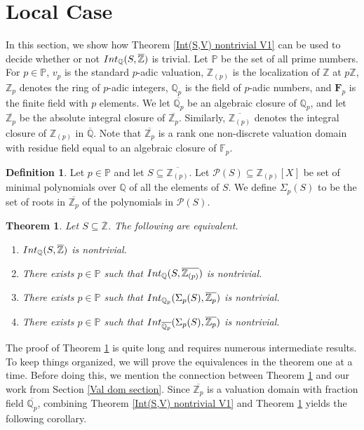 \documentclass{article}
\newtheorem{Thm}[equation]{Theorem}
\theoremstyle{definition}\newtheorem{Def}[equation]{Definition}
\theoremstyle{definition}\newtheorem{Ques}[equation]{Question}
\theoremstyle{definition}\newtheorem{Conj}[equation]{Conjecture}
\theoremstyle{definition}\newtheorem{Not}[equation]{Notation}
\newcommand{\Q}{\mathbb{Q}}
\newcommand{\oQ}{\overline{\Q}}
\newcommand{\oZ}{\overline{\Z}}
\newcommand{\Z}{\mathbb{Z}}
\newcommand{\oZp}{\overline{\Z_p}}
\newcommand{\oQZp}{\overline{\Z_{(p)}}}
\newcommand{\oQp}{\overline{\Q_p}}
\newcommand{\Int}{\textnormal{Int}}
\newcommand{\IntQ}{\Int_{\Q}}
\newcommand{\PP}{\mathbb{P}}
\numberwithin{equation}{section}
\begin{document}
\section{Local Case}\label{Local section}
In this section, we show how Theorem \ref{Int(S,V) nontrivial V1} can be used to decide whether or not $\IntQ(S,\oZ)$ is trivial. Let $\PP$ be the set of all prime numbers. For $p \in \PP$, $v_p$ is the standard $p$-adic valuation, $\Z_{(p)}$ is the localization of $\Z$ at $p\Z$, $\Z_p$ denotes the ring of $p$-adic integers, $\Q_p$ is the field of $p$-adic numbers, and $\mathbf{F}_p$ is the finite field with $p$ elements. We let $\oQp$ be an algebraic closure of $\Q_p$, and let $\oZp$ be the absolute integral closure of $\oZp$. Similarly, $\overline{\Z_{(p)}}$ denotes the integral closure of $\Z_{(p)}$ in $\oQ$. Note that $\oZp$ is a rank one non-discrete valuation domain with residue field equal to an algebraic closure of $\mathbb F_p$.%

\begin{Def}\label{Sigma_p}
Let $p \in \PP$ and let $S \subseteq \overline{\Z_{(p)}}$. Let $\mathcal{P}(S)\subseteq\Z_{(p)}[X]$ be set of minimal polynomials over $\Q$ of all the elements of $S$. We define $\Sigma_p(S)$ to be the set of roots in $\oZp$ of the polynomials in $\mathcal{P}(S)$. %
\end{Def}


\begin{Thm}\label{Big thm local case}
Let $S \subseteq \oZ$. The following are equivalent.
\begin{enumerate}[(1)]
\item $\IntQ(S,\oZ)$ is nontrivial.
\item There exists $p \in \PP$ such that $\IntQ(S, \oQZp)$ is nontrivial.
\item There exists $p \in \PP$ such that $\Int_{\Q_p}(\Sigma_p(S), \oZp)$ is nontrivial.
\item There exists $p \in \PP$ such that $\Int_{\oQp}(\Sigma_p(S), \oZp)$ is nontrivial.
\end{enumerate}
\end{Thm}


The proof of Theorem \ref{Big thm local case} is quite long and requires numerous intermediate results. To keep things organized, we will prove the equivalences in the theorem one at a time. Before doing this, we mention the connection between Theorem \ref{Big thm local case} and our work from Section \ref{Val dom section}. Since $\oZp$ is a valuation domain with fraction field $\oQp$, combining Theorem \ref{Int(S,V) nontrivial V1} and Theorem \ref{Big thm local case} yields the following corollary.
\end{document}
